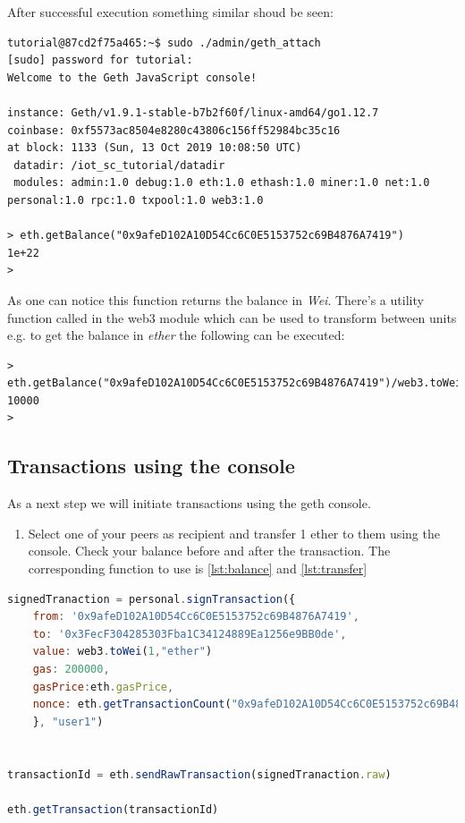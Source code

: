 \documentclass[a4paper]{article}
\begin{document}
After successful execution something similar shoud be seen:
\begin{verbatim}
tutorial@87cd2f75a465:~$ sudo ./admin/geth_attach 
[sudo] password for tutorial: 
Welcome to the Geth JavaScript console!

instance: Geth/v1.9.1-stable-b7b2f60f/linux-amd64/go1.12.7
coinbase: 0xf5573ac8504e8280c43806c156ff52984bc35c16
at block: 1133 (Sun, 13 Oct 2019 10:08:50 UTC)
 datadir: /iot_sc_tutorial/datadir
 modules: admin:1.0 debug:1.0 eth:1.0 ethash:1.0 miner:1.0 net:1.0 personal:1.0 rpc:1.0 txpool:1.0 web3:1.0

> eth.getBalance("0x9afeD102A10D54Cc6C0E5153752c69B4876A7419")
1e+22
> 
\end{verbatim}

As one can notice this  function returns the balance in \emph{Wei}. There's a utility function called  in the web3 module which can be used to transform between units e.g. to get the balance in \emph{ether} the following can be executed:
\begin{verbatim}
> eth.getBalance("0x9afeD102A10D54Cc6C0E5153752c69B4876A7419")/web3.toWei(1,"ether")
10000
> 
\end{verbatim}



\subsection{Transactions using the console}

As a next step we will initiate transactions using the geth console.

\begin{enumerate}[label=\textbf{Task \arabic*}:,l_tasks]
\item Select one of your peers as recipient and transfer 1 ether to them using the console. Check your balance before and after the transaction. The corresponding function to use is \ref{lst:balance} and \ref{lst:transfer}
\end{enumerate}

\begin{lstlisting}[language=javascript,caption={Functions to be used for signing and sending a transaction},label={lst:transfer}]
signedTranaction = personal.signTransaction({
    from: '0x9afeD102A10D54Cc6C0E5153752c69B4876A7419',
    to: '0x3FecF304285303Fba1C34124889Ea1256e9BB0de',
    value: web3.toWei(1,"ether")
    gas: 200000, 
    gasPrice:eth.gasPrice,
    nonce: eth.getTransactionCount("0x9afeD102A10D54Cc6C0E5153752c69B4876A7419")
    }, "user1")


transactionId = eth.sendRawTransaction(signedTranaction.raw)

eth.getTransaction(transactionId)
\end{lstlisting}
\end{document}
